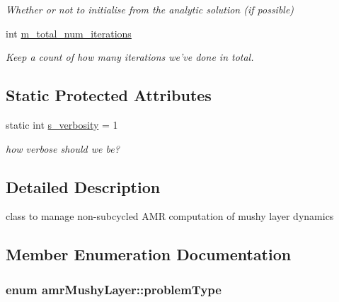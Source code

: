 \begin{DoxyCompactItemize}
\begin{DoxyCompactList}\small\item\em Whether or not to initialise from the analytic solution (if possible) \end{DoxyCompactList}\item 
\hypertarget{classamr_mushy_layer_a125264af73838934c050238aaede242a}{int \hyperlink{classamr_mushy_layer_a125264af73838934c050238aaede242a}{m\-\_\-total\-\_\-num\-\_\-iterations}}\label{classamr_mushy_layer_a125264af73838934c050238aaede242a}

\begin{DoxyCompactList}\small\item\em Keep a count of how many iterations we've done in total. \end{DoxyCompactList}\end{DoxyCompactItemize}
\subsection*{Static Protected Attributes}
\begin{DoxyCompactItemize}
\item 
\hypertarget{classamr_mushy_layer_a3844d5fcc9b4306b0b0d35609727222c}{static int \hyperlink{classamr_mushy_layer_a3844d5fcc9b4306b0b0d35609727222c}{s\-\_\-verbosity} = 1}\label{classamr_mushy_layer_a3844d5fcc9b4306b0b0d35609727222c}

\begin{DoxyCompactList}\small\item\em how verbose should we be? \end{DoxyCompactList}\end{DoxyCompactItemize}


\subsection{Detailed Description}
class to manage non-\/subcycled A\-M\-R computation of mushy layer dynamics 

\subsection{Member Enumeration Documentation}
\hypertarget{classamr_mushy_layer_aa2979f33ff164690d99ca7f334c49ac7}{
\subsubsection[{problem\-Type}]{\setlength{\rightskip}{0pt plus 5cm}enum {\bf amr\-Mushy\-Layer\-::problem\-Type}\hspace{0.3cm}{\ttfamily [protected]}}}\label{classamr_mushy_layer_aa2979f33ff164690d99ca7f334c49ac7}


